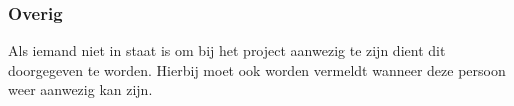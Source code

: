 \subsubsection{Overig}
Als iemand niet in staat is om bij het project aanwezig te zijn dient dit doorgegeven
te worden. Hierbij moet ook worden vermeldt wanneer deze persoon weer aanwezig kan 
zijn.

